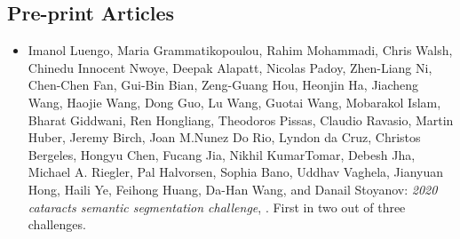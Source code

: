 \subsection*{Pre-print Articles}
\begin{itemize}
    \item Imanol Luengo, Maria Grammatikopoulou, Rahim Mohammadi, Chris Walsh, Chinedu Innocent Nwoye, Deepak Alapatt, Nicolas Padoy, Zhen-Liang Ni, Chen-Chen Fan, Gui-Bin Bian, Zeng-Guang Hou, Heonjin Ha, Jiacheng Wang, Haojie Wang, Dong Guo, Lu Wang, Guotai Wang, Mobarakol Islam, Bharat Giddwani, Ren Hongliang, Theodoros Pissas, Claudio Ravasio, Martin Huber, Jeremy Birch, Joan M.Nunez Do Rio, Lyndon da Cruz, Christos Bergeles, Hongyu Chen, Fucang Jia, Nikhil KumarTomar, Debesh Jha, Michael A. Riegler, Pal Halvorsen, Sophia Bano, Uddhav Vaghela, Jianyuan Hong, Haili Ye, Feihong Huang, Da-Han Wang, and Danail Stoyanov: \textit{2020 cataracts semantic segmentation challenge}, \cite{luengo20212020}. First in two out of three challenges.
\end{itemize}
